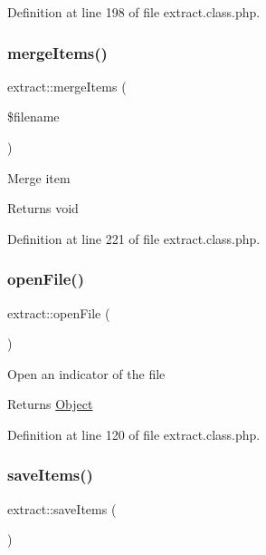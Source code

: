 Definition at line 198 of file extract.\+class.\+php.

\hypertarget{classextract_a03f6e68633c0e2f0885d8990efc21b5d}{}\label{classextract_a03f6e68633c0e2f0885d8990efc21b5d} 
\subsubsection{\texorpdfstring{merge\+Items()}{mergeItems()}}
{\footnotesize\ttfamily extract\+::merge\+Items (\begin{DoxyParamCaption}\item[{}]{\$filename }\end{DoxyParamCaption})}

Merge item \begin{DoxyReturn}{Returns}
void 
\end{DoxyReturn}


Definition at line 221 of file extract.\+class.\+php.

\hypertarget{classextract_afe5c47d4a18adeb1cb9fb0e7450def78}{}\label{classextract_afe5c47d4a18adeb1cb9fb0e7450def78} 
\subsubsection{\texorpdfstring{open\+File()}{openFile()}}
{\footnotesize\ttfamily extract\+::open\+File (\begin{DoxyParamCaption}{ }\end{DoxyParamCaption})}

Open an indicator of the file \begin{DoxyReturn}{Returns}
\hyperlink{classObject}{Object} 
\end{DoxyReturn}


Definition at line 120 of file extract.\+class.\+php.

\hypertarget{classextract_a00d078dc669fb822cbf073b04ec8668d}{}\label{classextract_a00d078dc669fb822cbf073b04ec8668d} 
\subsubsection{\texorpdfstring{save\+Items()}{saveItems()}}
{\footnotesize\ttfamily extract\+::save\+Items (\begin{DoxyParamCaption}{ }\end{DoxyParamCaption})}

